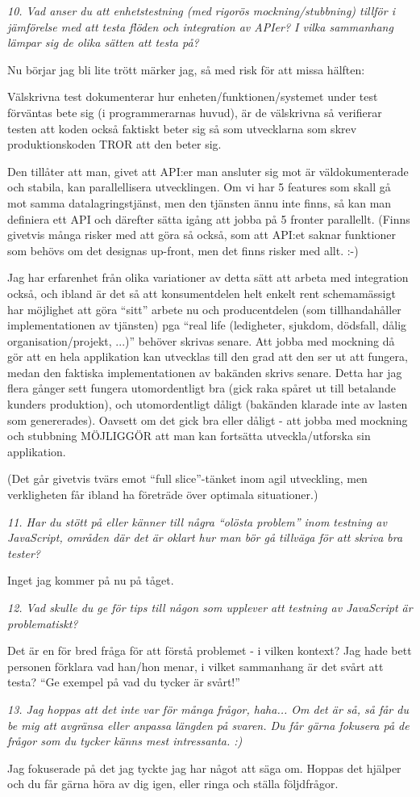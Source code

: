 \documentclass[11pt]{article}
\begin{document}
\emph{10. Vad anser du att enhetstestning (med rigorös mockning/stubbning)
tillför i jämförelse med att testa flöden och integration av APIer? I
vilka sammanhang lämpar sig de olika sätten att testa på?}

Nu börjar jag bli lite trött märker jag, så med risk för att missa
hälften:

Välskrivna test dokumenterar hur enheten/funktionen/systemet under
test förväntas bete sig (i programmerarnas huvud), är de välskrivna så
verifierar testen att koden också faktiskt beter sig så som utvecklarna
som skrev produktionskoden TROR att den beter sig.

Den tillåter att man, givet att API:er man ansluter sig mot är
väldokumenterade och stabila, kan parallellisera utvecklingen. Om vi har
5 features som skall gå mot samma datalagringstjänst, men den tjänsten
ännu inte finns, så kan man definiera ett API och därefter sätta igång
att jobba på 5 fronter parallellt. (Finns givetvis många risker med att
göra så också, som att API:et saknar funktioner som behövs om det
designas up-front, men det finns risker med allt. :-)

Jag har erfarenhet från olika variationer av detta sätt att arbeta med
integration också, och ibland är det så att konsumentdelen helt enkelt
rent schemamässigt har möjlighet att göra ``sitt'' arbete nu och
producentdelen (som tillhandahåller implementationen av tjänsten) pga
``real life (ledigheter, sjukdom, dödsfall, dålig
organisation/projekt, ...)'' behöver skrivas senare. Att jobba med
mockning då gör att en hela applikation kan utvecklas till den grad att
den ser ut att fungera, medan den faktiska implementationen av bakänden
skrivs senare. Detta har jag flera gånger sett fungera utomordentligt
bra (gick raka spåret ut till betalande kunders produktion), och
utomordentligt dåligt (bakänden klarade inte av lasten som genererades).
Oavsett om det gick bra eller dåligt - att jobba med mockning och
stubbning MÖJLIGGÖR att man kan fortsätta utveckla/utforska sin
applikation.

(Det går givetvis tvärs emot ``full slice''-tänket inom agil utveckling,
men verkligheten får ibland ha företräde över optimala situationer.)

\emph{11. Har du stött på eller känner till några ``olösta problem'' inom testning
av JavaScript, områden där det är oklart hur man bör gå tillväga för
att skriva bra tester?}

Inget jag kommer på nu på tåget.

\emph{12. Vad skulle du ge för tips till någon som upplever att testning av
JavaScript är problematiskt?}

Det är en för bred fråga för att förstå problemet - i vilken kontext?
Jag hade bett personen förklara vad han/hon menar, i vilket sammanhang
är det svårt att testa? ``Ge exempel på vad du tycker är svårt!''

\emph{13. Jag hoppas att det inte var för många frågor, haha... Om det är så, så
får du be mig att avgränsa eller anpassa längden på svaren. Du får
gärna fokusera på de frågor som du tycker känns mest intressanta. :)}

Jag fokuserade på det jag tyckte jag har något att säga om. Hoppas det
hjälper och du får gärna höra av dig igen, eller ringa och ställa
följdfrågor.
\end{document}
